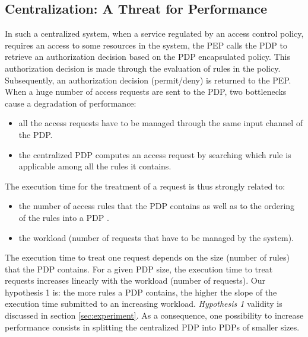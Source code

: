 \subsection{Centralization: A Threat for Performance}
In such a centralized system, when a service regulated by an access control policy, requires an access to some resources in the system, the PEP calls the PDP to 
retrieve an authorization decision based on the PDP encapsulated policy. This authorization decision is made through the evaluation of rules in the policy. 
Subsequently, an authorization decision (permit/deny) is returned to the PEP. When a huge number of access requests are sent to the PDP, two bottlenecks cause a degradation of performance:
\begin{itemize}
 \item all the access requests have to be managed through the same input channel of the PDP. 
 \item the centralized PDP computes an access request by searching which rule is applicable among all the rules it contains.
\end{itemize}

The execution time for the treatment of a request is thus strongly related to:
\begin{itemize} 
\item the number of access rules that the PDP contains as well as to the ordering of the rules into a PDP \cite{clustering}.
\item the workload (number of requests that have to be managed by the system).
\end{itemize}
The execution time to treat one request depends on the size (number of rules) that the PDP contains. For a given PDP size, the execution time  to treat requests increases linearly with the workload (number of requests). 
Our hypothesis 1 is: the more rules a PDP contains, the higher the slope of the execution time submitted to an increasing workload. 
 \textit{Hypothesis 1} validity is discussed in section \ref{sec:experiment}.
As a consequence, one possibility to increase performance consists in splitting the centralized PDP into PDPs of smaller sizes. 


